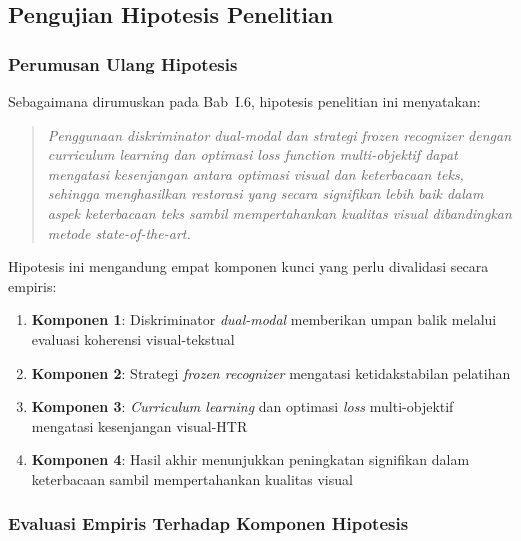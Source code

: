 \documentclass[12pt,a4paper]{article}
\begin{document}
\vspace{0.8em}

\subsection{Pengujian Hipotesis Penelitian}
\label{subsec:pengujian-hipotesis}
\vspace{0.8em}

\subsubsection{Perumusan Ulang Hipotesis}
\label{subsubsec:perumusan-hipotesis}

Sebagaimana dirumuskan pada Bab~I.6, hipotesis penelitian ini menyatakan:

\begin{quote}
\textit{Penggunaan diskriminator dual-modal dan strategi frozen recognizer dengan curriculum learning dan optimasi loss function multi-objektif dapat mengatasi kesenjangan antara optimasi visual dan keterbacaan teks, sehingga menghasilkan restorasi yang secara signifikan lebih baik dalam aspek keterbacaan teks sambil mempertahankan kualitas visual dibandingkan metode state-of-the-art.}
\end{quote}

Hipotesis ini mengandung empat komponen kunci yang perlu divalidasi secara empiris:

\begin{enumerate}[nosep]
    \item \textbf{Komponen 1}: Diskriminator \textit{dual-modal} memberikan umpan balik melalui evaluasi koherensi visual-tekstual
    \item \textbf{Komponen 2}: Strategi \textit{frozen recognizer} mengatasi ketidakstabilan pelatihan
    \item \textbf{Komponen 3}: \textit{Curriculum learning} dan optimasi \textit{loss} multi-objektif mengatasi kesenjangan visual-HTR
    \item \textbf{Komponen 4}: Hasil akhir menunjukkan peningkatan signifikan dalam keterbacaan sambil mempertahankan kualitas visual
\end{enumerate}

\vspace{0.8em}

\subsubsection{Evaluasi Empiris Terhadap Komponen Hipotesis}
\label{subsubsec:evaluasi-komponen-hipotesis}
\end{document}

